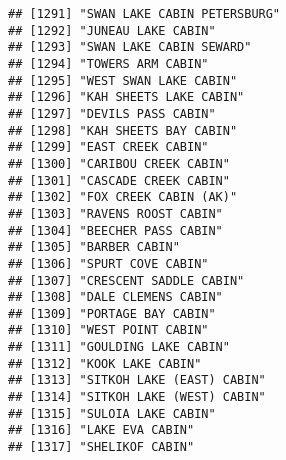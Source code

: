 \documentclass[
]{article}
\begin{document}
\begin{verbatim}
## [1291] "SWAN LAKE CABIN PETERSBURG"                                                          
## [1292] "JUNEAU LAKE CABIN"                                                                   
## [1293] "SWAN LAKE CABIN SEWARD"                                                              
## [1294] "TOWERS ARM CABIN"                                                                    
## [1295] "WEST SWAN LAKE CABIN"                                                                
## [1296] "KAH SHEETS LAKE CABIN"                                                               
## [1297] "DEVILS PASS CABIN"                                                                   
## [1298] "KAH SHEETS BAY CABIN"                                                                
## [1299] "EAST CREEK CABIN"                                                                    
## [1300] "CARIBOU CREEK CABIN"                                                                 
## [1301] "CASCADE CREEK CABIN"                                                                 
## [1302] "FOX CREEK CABIN (AK)"                                                                
## [1303] "RAVENS ROOST CABIN"                                                                  
## [1304] "BEECHER PASS CABIN"                                                                  
## [1305] "BARBER CABIN"                                                                        
## [1306] "SPURT COVE CABIN"                                                                    
## [1307] "CRESCENT SADDLE CABIN"                                                               
## [1308] "DALE CLEMENS CABIN"                                                                  
## [1309] "PORTAGE BAY CABIN"                                                                   
## [1310] "WEST POINT CABIN"                                                                    
## [1311] "GOULDING LAKE CABIN"                                                                 
## [1312] "KOOK LAKE CABIN"                                                                     
## [1313] "SITKOH LAKE (EAST) CABIN"                                                            
## [1314] "SITKOH LAKE (WEST) CABIN"                                                            
## [1315] "SULOIA LAKE CABIN"                                                                   
## [1316] "LAKE EVA CABIN"                                                                      
## [1317] "SHELIKOF CABIN"                                                                      

\end{verbatim}
\end{document}
